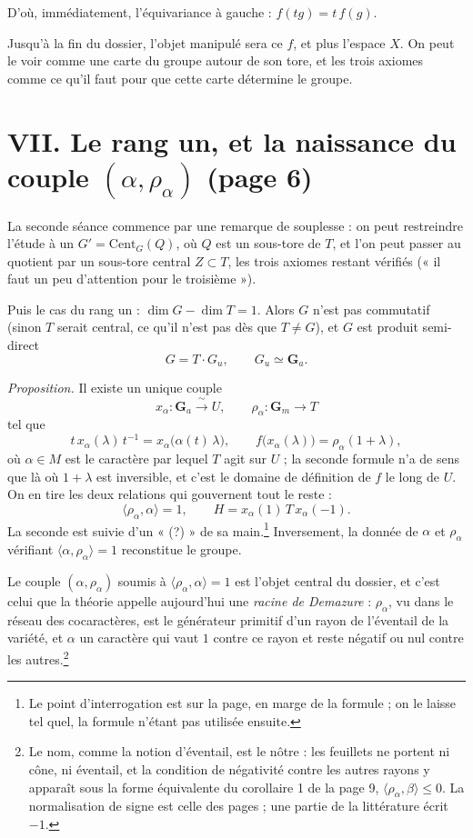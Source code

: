 \documentclass[11pt,a4paper]{article}
\begin{document}
D'où, immédiatement, l'équivariance à gauche : $f(tg) = t\,f(g)$.

Jusqu'à la fin du dossier, l'objet manipulé sera ce $f$, et plus l'espace $X$. On peut le voir comme une carte du groupe autour de son tore, et les
trois axiomes comme ce qu'il faut pour que cette carte détermine le groupe.

\section*{VII. Le rang un, et la naissance du couple $(\alpha, \rho_\alpha)$ (page 6)}

La seconde séance commence par une remarque de souplesse : on peut restreindre
l'étude à un $G' = \mathrm{Cent}_G(Q)$, où $Q$ est un sous-tore de $T$, et l'on
peut passer au quotient par un sous-tore central $Z \subset T$, les trois
axiomes restant vérifiés (« il faut un peu d'attention pour le troisième »).

Puis le cas du rang un : $\dim G - \dim T = 1$. Alors $G$ n'est pas commutatif
(sinon $T$ serait central, ce qu'il n'est pas dès que $T \neq G$), et $G$ est
produit semi-direct
\[
  G = T \cdot G_u, \qquad G_u \simeq \mathbf{G}_a .
\]

\emph{Proposition.} Il existe un unique couple
\[
  x_\alpha : \mathbf{G}_a \xrightarrow{\ \sim\ } U, \qquad
  \rho_\alpha : \mathbf{G}_m \longrightarrow T
\]
tel que
\[
  t\,x_\alpha(\lambda)\,t^{-1} = x_\alpha\bigl(\alpha(t)\,\lambda\bigr),
  \qquad
  f\bigl(x_\alpha(\lambda)\bigr) = \rho_\alpha(1+\lambda),
\]
où $\alpha \in M$ est le caractère par lequel $T$ agit sur $U$ ; la seconde
formule n'a de sens que là où $1 + \lambda$ est inversible, et c'est le domaine de définition de $f$ le long de $U$. On en tire les deux
relations qui gouvernent tout le reste :
\[
  \langle \rho_\alpha, \alpha \rangle = 1, \qquad
  H = x_\alpha(1)\, T\, x_\alpha(-1).
\]
La seconde est suivie d'un « (?) » de sa main.\footnote{Le point
d'interrogation est sur la page, en marge de la formule ; on le laisse tel
quel, la formule n'étant pas utilisée ensuite.} Inversement, la donnée de
$\alpha$ et $\rho_\alpha$ vérifiant $\langle \alpha, \rho_\alpha \rangle = 1$
reconstitue le groupe.

Le couple $(\alpha, \rho_\alpha)$ soumis à $\langle \rho_\alpha, \alpha \rangle
= 1$ est l'objet central du dossier, et c'est celui que la théorie appelle
aujourd'hui une \emph{racine de Demazure} : $\rho_\alpha$, vu dans le réseau
des cocaractères, est le générateur primitif d'un rayon de l'éventail de la
variété, et $\alpha$ un caractère qui vaut $1$ contre ce rayon et reste négatif
ou nul contre les autres.\footnote{Le nom, comme la notion d'éventail, est le
nôtre : les feuillets ne portent ni cône, ni éventail, et la condition de
négativité contre les autres rayons y apparaît sous la forme équivalente du
corollaire 1 de la page 9, $\langle \rho_\alpha, \beta \rangle \leq 0$. La
normalisation de signe est celle des pages ; une partie de la littérature
écrit $-1$.}
\end{document}
